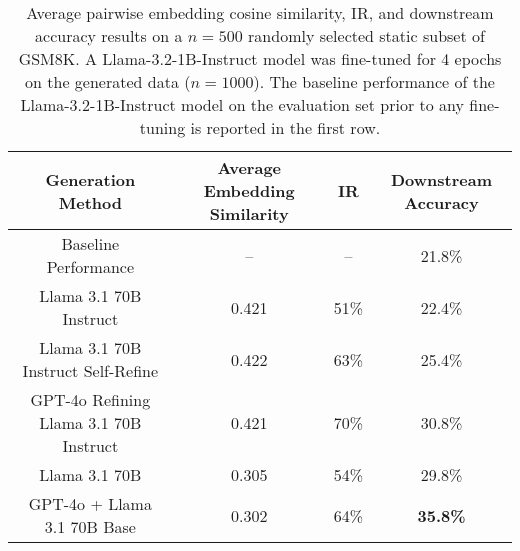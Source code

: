 \begin{table}[H]
\caption{Average pairwise embedding cosine similarity, IR, and downstream accuracy results on a $n=500$ randomly selected static subset of GSM8K. A Llama-3.2-1B-Instruct model was fine-tuned for 4 epochs on the generated data ($n=1000$). The baseline performance of the Llama-3.2-1B-Instruct model on the evaluation set prior to any fine-tuning is reported in the first row.}
\label{gsm8k-refine}
\vskip 0.1in
\begin{center}
\begin{small}
\begin{sc} 
\begin{tabular}{c|ccc}
\toprule
Generation Method & Average Embedding Similarity & IR & Downstream Accuracy \\
\midrule
Baseline Performance                   &   --  &  --  & 21.8\% \\
\midrule
Llama 3.1 70B Instruct                 & 0.421 & 51\% & 22.4\% \\
Llama 3.1 70B Instruct Self-Refine     & 0.422 & 63\% & 25.4\% \\
GPT-4o Refining Llama 3.1 70B Instruct & 0.421 & 70\% & 30.8\% \\
\midrule
\Sys{} Llama 3.1 70B                   & 0.305 & 54\% & 29.8\% \\
\Sys{} GPT-4o + Llama 3.1 70B Base     & 0.302 & 64\% & \textbf{35.8\%} \\
\bottomrule
\end{tabular}
\end{sc}
\end{small}
\end{center}
\vskip -0.1in
\end{table}
